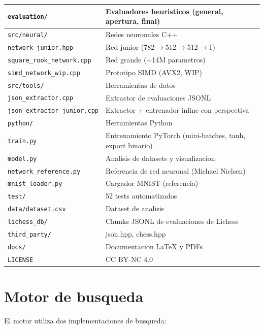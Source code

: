 \documentclass[11pt,a4paper]{article}
\begin{document}
\begin{center}
\begin{tabularx}{\textwidth}{@{}l X@{}}
\quad \texttt{evaluation/} & Evaluadores heuristicos (general, apertura, final) \\
\midrule
\texttt{src/neural/} & Redes neuronales C++ \\
\quad \texttt{network\_junior.hpp} & Red junior (782$\to$512$\to$512$\to$1) \\
\quad \texttt{square\_rook\_network.cpp} & Red grande ($\sim$14M parametros) \\
\quad \texttt{simd\_network\_wip.cpp} & Prototipo SIMD (AVX2, WIP) \\
\midrule
\texttt{src/tools/} & Herramientas de datos \\
\quad \texttt{json\_extractor.cpp} & Extractor de evaluaciones JSONL \\
\quad \texttt{json\_extractor\_junior.cpp} & Extractor + entrenador inline con perspectiva \\
\midrule
\texttt{python/} & Herramientas Python \\
\quad \texttt{train.py} & Entrenamiento PyTorch (mini-batches, tanh, export binario) \\
\quad \texttt{model.py} & Analisis de datasets y visualizacion \\
\quad \texttt{network\_reference.py} & Referencia de red neuronal (Michael Nielsen) \\
\quad \texttt{mnist\_loader.py} & Cargador MNIST (referencia) \\
\midrule
\texttt{test/} & 52 tests automatizados \\
\texttt{data/dataset.csv} & Dataset de analisis \\
\texttt{lichess\_db/} & Chunks JSONL de evaluaciones de Lichess \\
\texttt{third\_party/} & json.hpp, chess.hpp \\
\texttt{docs/} & Documentacion LaTeX y PDFs \\
\texttt{LICENSE} & CC BY-NC 4.0 \\
\bottomrule
\end{tabularx}
\end{center}

\section{Motor de busqueda}

El motor utiliza dos implementaciones de busqueda:
\end{document}
